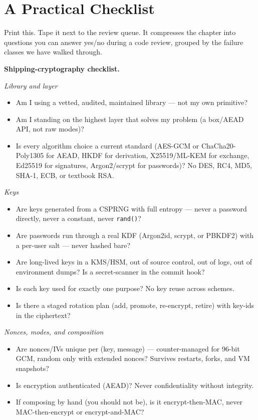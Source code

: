 \section{A Practical Checklist}
\label{ch39:checklist}

Print this. Tape it next to the review queue. It compresses the chapter into
questions you can answer yes/no during a code review, grouped by the failure
classes we have walked through.

\begin{focusbox}
\textbf{Shipping-cryptography checklist.}

\emph{Library and layer}
\begin{itemize}
  \item Am I using a vetted, audited, maintained library --- not my own primitive?
  \item Am I standing on the highest layer that solves my problem (a box/AEAD API,
  not raw modes)?
  \item Is every algorithm choice a current standard (AES-GCM or ChaCha20-Poly1305
  for AEAD, HKDF for derivation, X25519/ML-KEM for exchange, Ed25519 for
  signatures, Argon2/scrypt for passwords)? No DES, RC4, MD5, SHA-1, ECB, or
  textbook RSA.
\end{itemize}

\emph{Keys}
\begin{itemize}
  \item Are keys generated from a CSPRNG with full entropy --- never a password
  directly, never a constant, never \texttt{rand()}?
  \item Are passwords run through a real KDF (Argon2id, scrypt, or PBKDF2) with a
  per-user salt --- never hashed bare?
  \item Are long-lived keys in a KMS/HSM, out of source control, out of logs, out of
  environment dumps? Is a secret-scanner in the commit hook?
  \item Is each key used for exactly one purpose? No key reuse across schemes.
  \item Is there a staged rotation plan (add, promote, re-encrypt, retire) with
  key-ids in the ciphertext?
\end{itemize}

\emph{Nonces, modes, and composition}
\begin{itemize}
  \item Are nonces/IVs unique per (key, message) --- counter-managed for 96-bit
  GCM, random only with extended nonces? Survives restarts, forks, and VM
  snapshots?
  \item Is encryption authenticated (AEAD)? Never confidentiality without
  integrity.
  \item If composing by hand (you should not be), is it encrypt-then-MAC, never
  MAC-then-encrypt or encrypt-and-MAC?
\end{itemize}


\end{focusbox}
